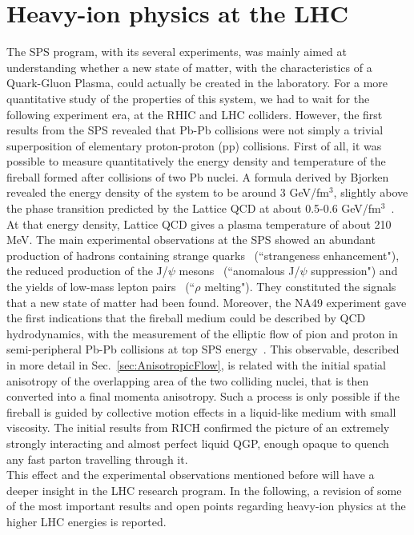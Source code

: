 \section{Heavy-ion physics at the LHC}
\label{sec:HIatLHC}
The SPS program, with its several experiments, 
was mainly aimed at understanding whether a new state of matter, with the 
characteristics of a Quark-Gluon Plasma, could actually be created in the laboratory.
For a more quantitative study of the properties of this
system, we had to wait for the following experiment era, at the RHIC and LHC colliders.
However, the first results from the SPS revealed that Pb-Pb collisions 
were not simply a trivial superposition of elementary proton-proton (pp) collisions.
First of all, it was possible to measure quantitatively
the energy density and temperature of the fireball formed after collisions of two Pb nuclei.
A formula derived by Bjorken~\cite{Bjorken} 
revealed the energy density of the system to be around
3 GeV/fm$^{3}$, slightly above the phase transition
predicted by the Lattice QCD at about 0.5-0.6 GeV/fm$^3$~\cite{Hands}. At that energy density,
Lattice QCD gives a plasma temperature of about 210 MeV. The main experimental observations at the SPS 
showed an abundant production of hadrons
containing strange quarks~\cite{Sandor:2004bg} (``strangeness enhancement"), 
the reduced production of the J/$\psi$ mesons~\cite{Abreu:2000ni} 
(``anomalous J/$\psi$ suppression") and the yields of 
low-mass lepton pairs~\cite{Damjanovic:2005ni} (``$\rho$ melting"). They constituted 
the signals that a new state of matter had been found.
Moreover, the NA49 experiment gave the first indications that the fireball medium 
could be described by QCD hydrodynamics, with the measurement
of the elliptic flow of pion and proton in semi-peripheral Pb-Pb collisions 
at top SPS energy~\cite{Alt:2003ab}. This observable, described in more detail 
in Sec.~\ref{sec:AnisotropicFlow}, is related with the
initial spatial anisotropy of the overlapping area of the two colliding nuclei, that is 
then converted into a final momenta anisotropy. Such a process is only possible 
if the fireball is guided by collective motion effects in a liquid-like medium with  
small viscosity. The initial results from RICH confirmed the picture 
of an extremely strongly interacting and almost perfect liquid QGP, enough opaque 
to quench any fast parton travelling through it.\\
This effect and the experimental observations mentioned before will 
have a deeper insight in the LHC research program. In the following, a revision of some of the most 
important results and open points regarding heavy-ion physics at the higher LHC energies
is reported. 

